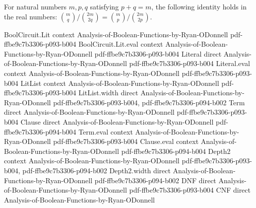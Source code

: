 \begin{lemma}
\leanok
{}
For natural numbers $m,p,q$ satisfying $p+q=m$, the following identity holds in the real
numbers: $\binom mq/\binom{2m}{2q}=\binom mp/\binom{2m}{2p}$.
\end{lemma}

\begin{theorem}
\leanok
{}
\proofstep
  {BoolCircuit.Lit}
  {context}
  {Analysis-of-Boolean-Functions-by-Ryan-ODonnell}
  {pdf-ffbe9c7b3306-p093-b004}
\proofstep
  {BoolCircuit.Lit.eval}
  {context}
  {Analysis-of-Boolean-Functions-by-Ryan-ODonnell}
  {pdf-ffbe9c7b3306-p093-b004}
\proofstep
  {Literal}
  {direct}
  {Analysis-of-Boolean-Functions-by-Ryan-ODonnell}
  {pdf-ffbe9c7b3306-p093-b004}
\proofstep
  {Literal.eval}
  {context}
  {Analysis-of-Boolean-Functions-by-Ryan-ODonnell}
  {pdf-ffbe9c7b3306-p093-b004}
\proofstep
  {LitList}
  {context}
  {Analysis-of-Boolean-Functions-by-Ryan-ODonnell}
  {pdf-ffbe9c7b3306-p093-b004}
\proofstep
  {LitList.width}
  {direct}
  {Analysis-of-Boolean-Functions-by-Ryan-ODonnell}
  {pdf-ffbe9c7b3306-p093-b004,
    pdf-ffbe9c7b3306-p094-b002}
\proofstep
  {Term}
  {direct}
  {Analysis-of-Boolean-Functions-by-Ryan-ODonnell}
  {pdf-ffbe9c7b3306-p093-b004}
\proofstep
  {Clause}
  {direct}
  {Analysis-of-Boolean-Functions-by-Ryan-ODonnell}
  {pdf-ffbe9c7b3306-p094-b004}
\proofstep
  {Term.eval}
  {context}
  {Analysis-of-Boolean-Functions-by-Ryan-ODonnell}
  {pdf-ffbe9c7b3306-p093-b004}
\proofstep
  {Clause.eval}
  {context}
  {Analysis-of-Boolean-Functions-by-Ryan-ODonnell}
  {pdf-ffbe9c7b3306-p094-b004}
\proofstep
  {Depth2}
  {context}
  {Analysis-of-Boolean-Functions-by-Ryan-ODonnell}
  {pdf-ffbe9c7b3306-p093-b004,
    pdf-ffbe9c7b3306-p094-b002}
\proofstep
  {Depth2.width}
  {direct}
  {Analysis-of-Boolean-Functions-by-Ryan-ODonnell}
  {pdf-ffbe9c7b3306-p094-b002}
\proofstep
  {DNF}
  {direct}
  {Analysis-of-Boolean-Functions-by-Ryan-ODonnell}
  {pdf-ffbe9c7b3306-p093-b004}
\proofstep
  {CNF}
  {direct}
  {Analysis-of-Boolean-Functions-by-Ryan-ODonnell}

\end{theorem}
